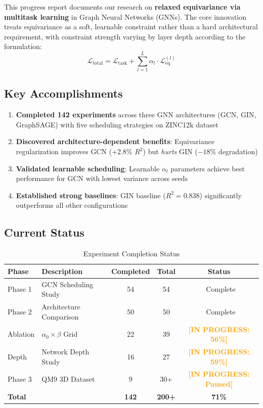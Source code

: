 \documentclass[11pt,a4paper]{article}
\newcommand{\inprogress}[1]{\textcolor{orange}{\textbf{[IN PROGRESS: #1]}}}
\newcommand{\completed}[1]{\textcolor{green!60!black}{\checkmark\ #1}}
\begin{document}
This progress report documents our research on \textbf{relaxed equivariance via multitask learning} in Graph Neural Networks (GNNs). The core innovation treats equivariance as a soft, learnable constraint rather than a hard architectural requirement, with constraint strength varying by layer depth according to the formulation:
\begin{equation}
    \mathcal{L}_{\text{total}} = \mathcal{L}_{\text{task}} + \sum_{l=1}^{L} \alpha_l \cdot \mathcal{L}_{\text{eq}}^{(l)}
\end{equation}

\subsection{Key Accomplishments}
\begin{enumerate}
    \item \textbf{Completed 142 experiments} across three GNN architectures (GCN, GIN, GraphSAGE) with five scheduling strategies on ZINC12k dataset
    \item \textbf{Discovered architecture-dependent benefits}: Equivariance regularization improves GCN (+2.8\% $R^2$) but \textit{hurts} GIN ($-18\%$ degradation)
    \item \textbf{Validated learnable scheduling}: Learnable $\alpha_l$ parameters achieve best performance for GCN with lowest variance across seeds
    \item \textbf{Established strong baselines}: GIN baseline ($R^2=0.838$) significantly outperforms all other configurations
\end{enumerate}

\subsection{Current Status}

\begin{table}[H]
\centering
\caption{Experiment Completion Status}
\label{tab:status}
\begin{tabular}{llccc}
\toprule
\textbf{Phase} & \textbf{Description} & \textbf{Completed} & \textbf{Total} & \textbf{Status} \\
\midrule
Phase 1 & GCN Scheduling Study & 54 & 54 & \completed{Complete} \\
Phase 2 & Architecture Comparison & 50 & 50 & \completed{Complete} \\
Ablation & $\alpha_0 \times \beta$ Grid & 22 & 39 & \inprogress{56\%} \\
Depth & Network Depth Study & 16 & 27 & \inprogress{59\%} \\
Phase 3 & QM9 3D Dataset & 9 & 30+ & \inprogress{Paused} \\
\midrule
\textbf{Total} & & \textbf{142} & \textbf{200+} & \textbf{71\%} \\
\bottomrule
\end{tabular}
\end{table}
\end{document}
